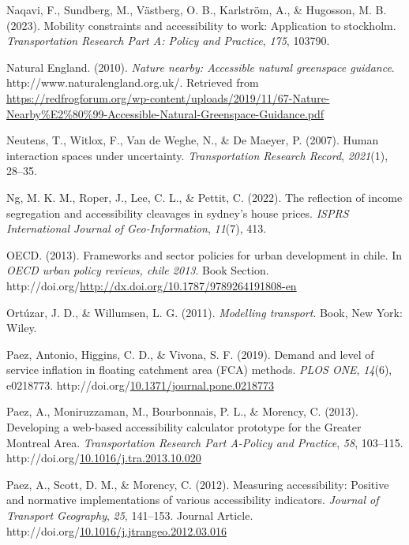 \documentclass[
11pt, %
oneside, %
english, %
singlespacing, %
]{macthesis} %
\newlength{\cslhangindent}
\newenvironment{CSLReferences}[2] %
{\begin{list}{}{%
	\setlength{\itemindent}{0pt}
	\setlength{\leftmargin}{0pt}
	\setlength{\parsep}{0pt}
	\ifodd #1
	\setlength{\leftmargin}{\cslhangindent}
	\setlength{\itemindent}{-1\cslhangindent}
	\fi
	\setlength{\itemsep}{#2\baselineskip}}}
{\end{list}}
\begin{document}
\begin{CSLReferences}{1}{0}
Naqavi, F., Sundberg, M., Västberg, O. B., Karlström, A., \& Hugosson, M. B. (2023). Mobility constraints and accessibility to work: Application to stockholm. \emph{Transportation Research Part A: Policy and Practice}, \emph{175}, 103790.

Natural England. (2010). \emph{Nature nearby: Accessible natural greenspace guidance}. http://www.naturalengland.org.uk/. Retrieved from \url{https://redfrogforum.org/wp-content/uploads/2019/11/67-Nature-Nearby\%E2\%80\%99-Accessible-Natural-Greenspace-Guidance.pdf}

Neutens, T., Witlox, F., Van de Weghe, N., \& De Maeyer, P. (2007). Human interaction spaces under uncertainty. \emph{Transportation Research Record}, \emph{2021}(1), 28--35.

Ng, M. K. M., Roper, J., Lee, C. L., \& Pettit, C. (2022). The reflection of income segregation and accessibility cleavages in sydney's house prices. \emph{ISPRS International Journal of Geo-Information}, \emph{11}(7), 413.

OECD. (2013). Frameworks and sector policies for urban development in chile. In \emph{OECD urban policy reviews, chile 2013}. Book Section. http://doi.org/\url{http://dx.doi.org/10.1787/9789264191808-en}

Ortúzar, J. D., \& Willumsen, L. G. (2011). \emph{Modelling transport}. Book, New York: Wiley.

Paez, Antonio, Higgins, C. D., \& Vivona, S. F. (2019). Demand and level of service inflation in floating catchment area ({FCA}) methods. \emph{{PLOS} {ONE}}, \emph{14}(6), e0218773. http://doi.org/\href{https://doi.org/10.1371/journal.pone.0218773}{10.1371/journal.pone.0218773}

Paez, A., Moniruzzaman, M., Bourbonnais, P. L., \& Morency, C. (2013). Developing a web-based accessibility calculator prototype for the {Greater} {Montreal} {Area}. \emph{Transportation Research Part A-Policy and Practice}, \emph{58}, 103--115. http://doi.org/\href{https://doi.org/10.1016/j.tra.2013.10.020}{10.1016/j.tra.2013.10.020}

Paez, A., Scott, D. M., \& Morency, C. (2012). Measuring accessibility: Positive and normative implementations of various accessibility indicators. \emph{Journal of Transport Geography}, \emph{25}, 141--153. Journal Article. http://doi.org/\href{https://doi.org/10.1016/j.jtrangeo.2012.03.016}{10.1016/j.jtrangeo.2012.03.016}


\end{CSLReferences}
\end{document}
